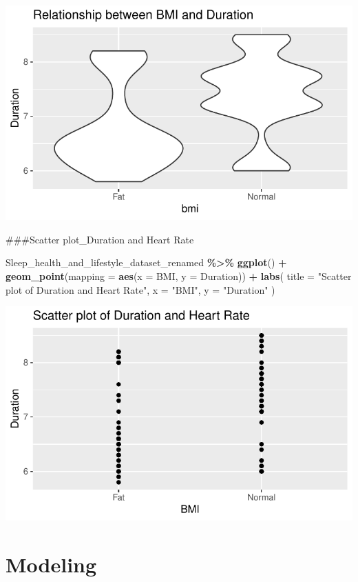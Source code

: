 \documentclass[
  11pt,
]{article}
\newenvironment{Shaded}{\begin{snugshade}}{\end{snugshade}}
\newcommand{\AttributeTok}[1]{\textcolor[rgb]{0.13,0.29,0.53}{#1}}
\newcommand{\FunctionTok}[1]{\textcolor[rgb]{0.13,0.29,0.53}{\textbf{#1}}}
\newcommand{\NormalTok}[1]{#1}
\newcommand{\SpecialCharTok}[1]{\textcolor[rgb]{0.81,0.36,0.00}{\textbf{#1}}}
\newcommand{\StringTok}[1]{\textcolor[rgb]{0.31,0.60,0.02}{#1}}
\begin{document}
\begin{center}\includegraphics[width=0.7\linewidth]{SleepHelath_files/figure-latex/unnamed-chunk-44-1} \end{center}

\#\#\#Scatter plot\_Duration and Heart Rate

\begin{Shaded}
\begin{Highlighting}[]
\NormalTok{Sleep\_health\_and\_lifestyle\_dataset\_renamed    }\SpecialCharTok{\%\textgreater{}\%} 
\FunctionTok{ggplot}\NormalTok{()    }\SpecialCharTok{+}
\FunctionTok{geom\_point}\NormalTok{(}\AttributeTok{mapping =} \FunctionTok{aes}\NormalTok{(}\AttributeTok{x =}\NormalTok{ BMI, }\AttributeTok{y =}\NormalTok{ Duration))    }\SpecialCharTok{+} 
\FunctionTok{labs}\NormalTok{(}
\AttributeTok{title =} \StringTok{"Scatter plot of Duration and Heart Rate"}\NormalTok{, }
\AttributeTok{x =} \StringTok{"BMI"}\NormalTok{,}
\AttributeTok{y =} \StringTok{"Duration"} 
\NormalTok{)}
\end{Highlighting}
\end{Shaded}

\begin{center}\includegraphics[width=0.7\linewidth]{SleepHelath_files/figure-latex/unnamed-chunk-45-1} \end{center}

\hypertarget{modeling}{%
\section{Modeling}\label{modeling}}
\end{document}
